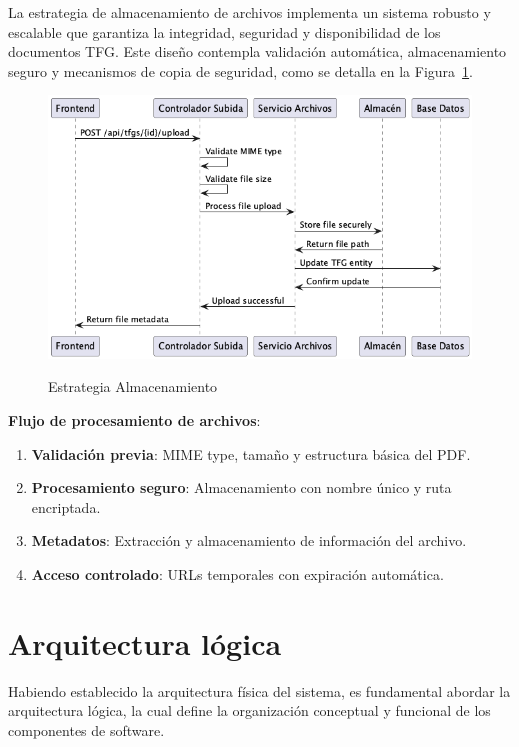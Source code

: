 \documentclass[12pt,a4paper,oneside]{report}
\providecommand{\tightlist}{%
  \setlength{\itemsep}{0pt}\setlength{\parskip}{0pt}}
\providecommand{\pandocbounded}[1]{#1}
\begin{document}
La estrategia de almacenamiento de archivos implementa un sistema robusto y escalable que garantiza la integridad, seguridad y disponibilidad de los documentos TFG. Este diseño contempla validación automática, almacenamiento seguro y mecanismos de copia de seguridad, como se detalla en la Figura~\ref{fig:estrategia-almacenamiento}.

\begin{figure}[H]
\centering
\pandocbounded{\includegraphics[keepaspectratio,alt={Estrategia Almacenamiento}]{processed/images/05_diseno_plantuml_2.png}}
\caption{Estrategia Almacenamiento}
\label{fig:estrategia-almacenamiento}
\end{figure}

\textbf{Flujo de procesamiento de archivos}:

\begin{enumerate}
\def\labelenumi{\arabic{enumi}.}
\tightlist
\item
  \textbf{Validación previa}: MIME type, tamaño y estructura básica del
  PDF.
\item
  \textbf{Procesamiento seguro}: Almacenamiento con nombre único y ruta
  encriptada.
\item
  \textbf{Metadatos}: Extracción y almacenamiento de información del
  archivo.
\item
  \textbf{Acceso controlado}: URLs temporales con expiración automática.
\end{enumerate}

\section{Arquitectura lógica}\label{arquitectura-luxf3gica}

Habiendo establecido la arquitectura física del sistema, es fundamental
abordar la arquitectura lógica, la cual define la organización
conceptual y funcional de los componentes de software. 
\end{document}
